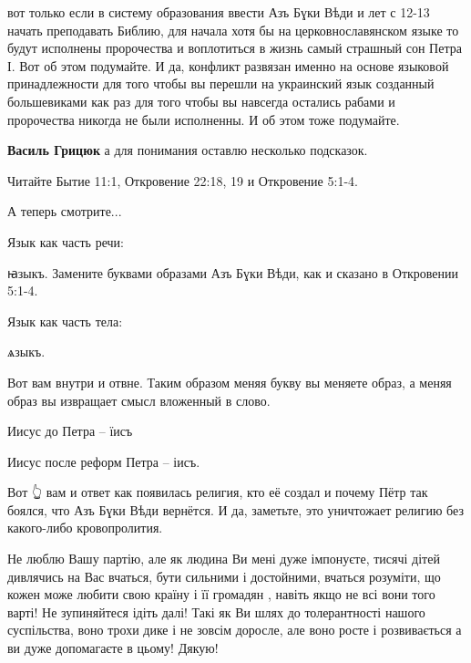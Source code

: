 \begin{itemize}
\begin{itemize}
вот только если в систему образования ввести Азъ Бɣки
Вѣди и лет с 12-13 начать преподавать Библию, для начала хотя бы на
церковнославянском языке то будут исполнены пророчества и воплотиться в жизнь
самый страшный сон Петра І. Вот об этом подумайте. И да, конфликт развязан
именно на основе языковой принадлежности для того чтобы вы перешли на
украинский язык созданный большевиками как раз для того чтобы вы навсегда
остались рабами и пророчества никогда не были исполненны. И об этом тоже
подумайте.


\textbf{Василь Грицюк} а для понимания оставлю несколько подсказок.

Читайте Бытие 11:1, Откровение 22:18, 19 и Откровение 5:1-4.

А теперь смотрите...

Язык как часть речи:

ꙗзыкъ. Замените буквами образами Азъ Бɣки Вѣди, как и сказано в Откровении
5:1-4.

Язык как часть тела:

ѧзыкъ.

Вот вам внутри и отвне. Таким образом меняя букву вы меняете образ, а меняя
образ вы извращает смысл вложенный в слово.

Иисус до Петра – їисъ

Иисус после реформ Петра – іисъ.

Вот 👆 вам и ответ как появилась религия, кто её создал и почему Пётр так
боялся, что Азъ Бɣки Вѣди вернётся. И да, заметьте, это уничтожает религию без
какого-либо кровопролития.

\end{itemize}


Не люблю Вашу партію, але як людина Ви мені дуже імпонуєте, тисячі дітей
дивлячись на Вас вчаться, бути сильними і достойними, вчаться розуміти, що
кожен може любити свою країну і її громадян , навіть якщо не всі вони того
варті! Не зупиняйтеся ідіть далі! Такі як Ви шлях до толерантності нашого
суспільства, воно трохи дике і не зовсім доросле, але воно росте і розвивається
а ви дуже допомагаєте в цьому! Дякую!



\end{itemize}
